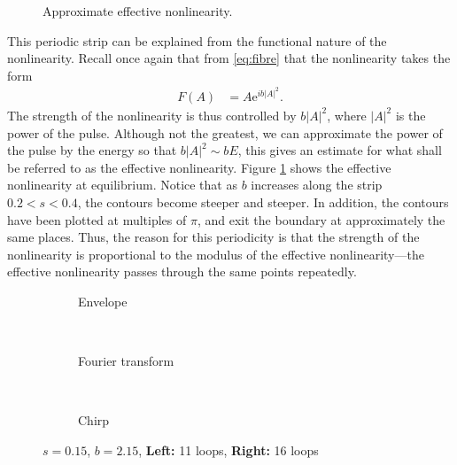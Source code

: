 %
\begin{figure}[tbp]
\centering

\caption{Approximate effective nonlinearity.}
\label{fig:effnl}
\end{figure}
This periodic strip can be explained from the functional nature of the nonlinearity. Recall once again that from \eqref{eq:fibre} that the nonlinearity takes the form
\begin{align*}
F(A) &= A \textrm{e}^{i b |A|^2}.
\end{align*}
The strength of the nonlinearity is thus controlled by $b |A|^2$, where $|A|^2$ is the power of the pulse. Although not the greatest, we can approximate the power of the pulse by the energy so that $b |A|^2 \sim b E$, this gives an estimate for what shall be referred to as the effective nonlinearity. Figure \ref{fig:effnl} shows the effective nonlinearity at equilibrium. Notice that as $b$ increases along the strip $0.2 < s < 0.4$, the contours become steeper and steeper. In addition, the contours have been plotted at multiples of $\pi$, and exit the boundary at approximately the same places. Thus, the reason for this periodicity is that the strength of the nonlinearity is proportional to the modulus of the effective nonlinearity---the effective nonlinearity passes through the same points repeatedly. \\

\begin{figure}[p]
\centering
\begin{subfigure}{\textwidth}
\centering
%

\caption{Envelope}
\end{subfigure} \\
\begin{subfigure}{\textwidth}
\centering
%

\caption{Fourier transform}
\end{subfigure} \\
\begin{subfigure}{\textwidth}
\centering
%

\caption{Chirp}
\end{subfigure}
\caption[Envelope, Fourier transform, and chirp of the pulse---unstable case.]{$s = 0.15$, $b = 2.15$, \textbf{Left:} 11 loops, \textbf{Right:} 16 loops}
\label{fig:break}
\end{figure}

